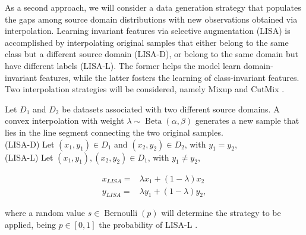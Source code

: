 As a second approach, we will consider a data generation strategy
that populates the gaps among source domain distributions with new 
observations obtained via interpolation. Learning invariant
features via selective augmentation (LISA) is accomplished by interpolating 
original samples that either belong to the same class but a 
different source domain (LISA-D), or belong to the same domain but have 
different labels (LISA-L). 
The former helps the model learn domain-invariant features, while the latter
fosters the learning of class-invariant features. Two interpolation
strategies will be considered, namely Mixup 
\cite{zhangMixupEmpiricalRisk2018}
and CutMix
\cite{yunCutMixRegularizationStrategy2019}.

\begin{definition}[LISA]
    Let $D_1$ and $D_2$ be datasets associated with two different source domains.
    A convex interpolation with weight $\lambda \sim \operatorname{Beta}(\alpha, \beta)$ 
    generates a new sample that lies in the 
    line segment connecting the two original samples. \\

    \vspace{-3.0mm}
    (LISA-D) Let $(x_1, y_1) \in D_1$ and $(x_2, y_2) \in D_2$, with $y_1 = y_2$, \\
    (LISA-L) Let $(x_1, y_1), (x_2, y_2) \in D_1$, with $y_1 \neq y_2$,
    \vspace{-1.0mm}

    $$
        \begin{aligned}
            x_{LISA} = & \lambda x_1 + (1 - \lambda) x_2 \\
            y_{LISA} = & \lambda y_1 + (1 - \lambda) y_2,
        \end{aligned}
    $$

    where a random value $s \in \operatorname{Bernoulli}(p)$ will determine
    the strategy to be applied, being $p \in [0,1]$ the probability of LISA-L
    \cite{yaoImprovingOutofDistributionRobustness2022}.
\end{definition}


